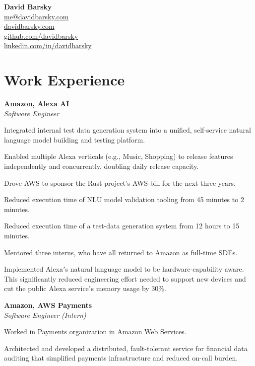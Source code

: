 \documentclass[10pt, a4paper]{article}
\newcommand{\note}[1]{\marginnote{\scriptsize #1}}
\renewenvironment{itemize}[1]{\begin{compactitem}#1}{\end{compactitem}}
\begin{document}
{\LARGE\textbf{David Barsky}}\\[.1cm]

\href{mailto:me@davidbarsky.com}{me@davidbarsky.com}\\
\href{http://davidbarsky.com}{davidbarsky.com}\\
\href{http://github.com/davidbarsky}{github.com/davidbarsky}\\
\href{http://linkedin.com/in/davidbarsky}{linkedin.com/in/davidbarsky}

\section*{\textbf{Work Experience}}

\note{Fall 2017–Present}
\textbf{Amazon, Alexa AI} \\
\emph{Software Engineer}
\begin{itemize}
	\item Integrated internal test data generation system into a unified, self-service natural language model building and testing platform.
	\item Enabled multiple Alexa verticals (e.g., Music, Shopping) to release features independently and concurrently, doubling daily release capacity.
	\item Drove AWS to sponsor the Rust project's AWS bill for the next three years.
	\item Reduced execution time of NLU model validation tooling from 45 minutes to 2 minutes.
	\item Reduced execution time of a test-data generation system from 12 hours to 15 minutes.
	\item Mentored three interns, who have all returned to Amazon as full-time SDEs.
	\item Implemented Alexaʼs natural language model to be hardware-capability aware. This significantly reduced engineering effort needed to support new devices and cut the public Alexa serviceʼs memory usage by 30\%. 
\end{itemize}

\note{Summer 2016}
\textbf{Amazon, AWS Payments} \\
\emph{Software Engineer (Intern)}
\begin{itemize}
	\item Worked in Payments organization in Amazon Web Services.
    \item Architected and developed a distributed, fault-tolerant service for financial data auditing that simplified payments infrastructure and reduced on-call burden.
\end{itemize}
\end{document}
